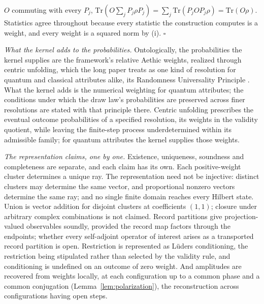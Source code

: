 $O$ commuting with every $P_j$, $\mathrm{Tr}(O\sum_j P_j\rho P_j) = \sum_j\mathrm{Tr}(P_jOP_j\rho) = \mathrm{Tr}(O\rho)$. Statistics agree throughout because every statistic the construction computes is a weight, and every weight is a squared norm by (i). \hfill$\square$

\noindent\textit{What the kernel adds to the probabilities.} Ontologically, the probabilities the kernel supplies are the framework's relative Aethic weights, realized through centric unfolding, which the long paper treats as one kind of resolution for quantum and classical attributes alike, its Randomness Universality Principle \cite{Aethus}. What the kernel adds is the numerical weighting for quantum attributes; the conditions under which the draw law's probabilities are preserved across finer resolutions are stated with that principle there. Centric unfolding prescribes the eventual outcome probabilities of a specified resolution, its weights in the validity quotient, while leaving the finite-step process underdetermined within its admissible family; for quantum attributes the kernel supplies those weights.

\noindent\textit{The representation claims, one by one.} Existence, uniqueness, soundness and completeness are separate, and each claim has its own. Each positive-weight cluster determines a unique ray. The representation need not be injective: distinct clusters may determine the same vector, and proportional nonzero vectors determine the same ray; and no single finite domain reaches every Hilbert state. Union is vector addition for disjoint clusters at coefficients $(1,1)$; closure under arbitrary complex combinations is not claimed. Record partitions give projection-valued observables soundly, provided the record map factors through the endpoints; whether every self-adjoint operator of interest arises as a transported record partition is open. Restriction is represented as L\"uders conditioning, the restriction being stipulated rather than selected by the validity rule, and conditioning is undefined on an outcome of zero weight. And amplitudes are recovered from weights locally, at each configuration up to a common phase and a common conjugation (Lemma~\ref{lem:polarization}), the reconstruction across configurations having open steps.

